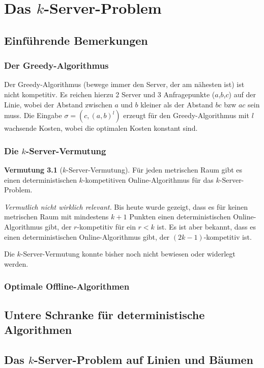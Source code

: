 \chapter{Das $k$-Server-Problem}


\section{Einführende Bemerkungen}

\subsection{Der Greedy-Algorithmus}

Der Greedy-Algorithmus (bewege immer den Server, der am nähesten ist) ist nicht kompetitiv. Es reichen hierzu 2 Server und 3 Anfragepunkte ($a$,$b$,$c$) auf der Linie, wobei der Abstand zwischen $a$ und $b$ kleiner als der Abstand $bc$ bzw $ac$ sein muss. Die Eingabe $\sigma = (c,(a,b)^l)$ erzeugt für den Greedy-Algorithmus mit $l$ wachsende Kosten, wobei die optimalen Kosten konstant sind.

\subsection{Die $k$-Server-Vermutung}

\textbf{Vermutung 3.1} ($k$-Server-Vermutung). Für jeden metrischen Raum gibt es einen deterministischen $k$-kompetitiven Online-Algorithmus für das $k$-Server-Problem.

\textit{Vermutlich nicht wirklich relevant.} Bis heute wurde gezeigt, dass es für keinen metrischen Raum mit mindestens $k+1$ Punkten einen deterministischen Online-Algorithmus gibt, der $r$-kompetitiv für ein $r < k$ ist. Es ist aber bekannt, dass es einen deterministischen Online-Algorithmus gibt, der $(2k-1)$-kompetitiv ist.

Die $k$-Server-Vermutung konnte bisher noch nicht bewiesen oder widerlegt werden.

\subsection{Optimale Offline-Algorithmen}


\section{Untere Schranke für deterministische Algorithmen}


\section{Das $k$-Server-Problem auf Linien und Bäumen}

